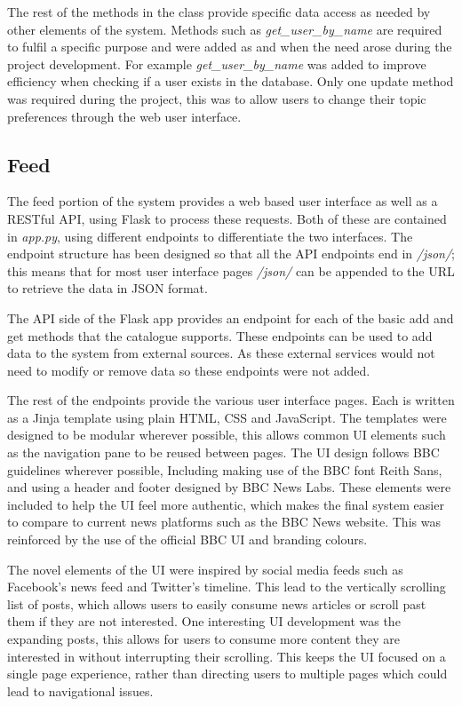 \documentclass[12pt,titlepage]{article}
\begin{document}
  The rest of the methods in the class provide specific data access as needed by
  other elements of the system. Methods such as \textit{get\_user\_by\_name} are
  required to fulfil a specific purpose and were added as and when the need
  arose during the project development. For example \textit{get\_user\_by\_name}
  was added to improve efficiency when checking if a user exists in the
  database. Only one update method was required during the project, this was to
  allow users to change their topic preferences through the web user interface.


  \subsection{Feed}

  The feed portion of the system provides a web based user interface as well as
  a RESTful API, using Flask to process these requests. Both of these are
  contained in \textit{app.py}, using different endpoints to differentiate the
  two interfaces. The endpoint structure has been designed so that all the API
  endpoints end in \textit{/json/}; this means that for most user interface
  pages \textit{/json/} can be appended to the URL to retrieve the data in JSON
  format.

  The API side of the Flask app provides an endpoint for each of the basic add
  and get methods that the catalogue supports. These endpoints can be used to
  add data to the system from external sources. As these external services would
  not need to modify or remove data so these endpoints were not added.

  The rest of the endpoints provide the various user interface pages. Each is
  written as a Jinja template using plain HTML, CSS and JavaScript. The
  templates were designed to be modular wherever possible, this allows common UI
  elements such as the navigation pane to be reused between pages. The UI design
  follows BBC guidelines wherever possible, Including making use of the BBC font
  Reith Sans, and using a header and footer designed by BBC News Labs. These
  elements were included to help the UI feel more authentic, which makes the
  final system easier to compare to current news platforms such as the BBC News
  website. This was reinforced by the use of the official BBC UI and branding
  colours.

  The novel elements of the UI were inspired by social media feeds such as
  Facebook's news feed and Twitter's timeline. This lead to the vertically
  scrolling list of posts, which allows users to easily consume news articles or
  scroll past them if they are not interested. One interesting UI development
  was the expanding posts, this allows for users to consume more content they
  are interested in without interrupting their scrolling. This keeps the UI
  focused on a single page experience, rather than directing users to multiple
  pages which could lead to navigational issues.
\end{document}
